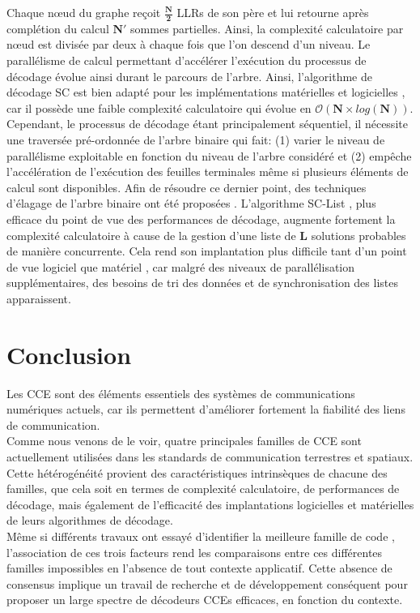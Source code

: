 \documentclass[../main.tex]{subfiles}
\begin{document}
Chaque nœud du graphe reçoit $\bm{\frac{N}{2}}$ LLRs de son père et lui retourne après complétion du calcul $\bm{N'}$ sommes partielles.
Ainsi, la complexité calculatoire par nœud est divisée par deux à chaque fois que l’on descend d’un niveau. Le parallélisme de calcul permettant d’accélérer l’exécution du processus de décodage évolue ainsi durant le parcours de l’arbre.
Ainsi, l’algorithme de décodage SC est bien adapté pour les implémentations matérielles \cite{88, 89, 90, 91, 92, 93} et logicielles \cite{PC:X1, PC:X2, PC:X3}, car il possède une faible complexité calculatoire qui évolue en $\mathcal{O}(\bm{N} \times log(\bm{N}))$.
Cependant, le processus de décodage étant principalement séquentiel, il nécessite une traversée pré-ordonnée de l’arbre binaire \cite{100} qui fait: (1) varier le niveau de parallélisme exploitable en fonction du niveau de l’arbre considéré et (2) empêche l’accélération de l’exécution des feuilles terminales même si plusieurs éléments de calcul sont disponibles.
Afin de résoudre ce dernier point, des techniques d’élagage de l’arbre binaire ont été proposées \cite{PC:prune}.
L’algorithme SC-List \cite{these_yann}, plus efficace du point de vue des performances de décodage, augmente fortement la complexité calculatoire à cause de la gestion d’une liste de \textbf{L} solutions probables de manière concurrente. Cela rend son implantation plus difficile tant d’un point de vue logiciel \cite{SCL:X1, SCL:X2} que matériel \cite{these_yann}, car malgré des niveaux de parallélisation supplémentaires, des besoins de tri des données et de synchronisation des listes apparaissent. 
% 
% 
% 
% 
% 
\section{Conclusion}
% 
% 
% 
% 
% 
Les CCE sont des éléments essentiels des systèmes de communications numériques actuels, car ils permettent d’améliorer fortement la fiabilité des liens de communication. \\
Comme nous venons de le voir, quatre principales familles de CCE sont actuellement utilisées dans les standards de communication terrestres et spatiaux. Cette hétérogénéité provient des caractéristiques intrinsèques de chacune des familles, que cela soit en termes de complexité calculatoire, de performances de décodage, mais également de l’efficacité des implantations logicielles et matérielles de leurs algorithmes de décodage.\\
Même si différents travaux ont essayé d’identifier la meilleure famille de code \cite{R1, R2, R3}, l’association de ces trois facteurs rend les comparaisons entre ces différentes familles impossibles en l’absence de tout contexte applicatif. Cette absence de consensus implique un travail de recherche et de développement conséquent pour proposer un large spectre de décodeurs CCEs efficaces, en fonction du contexte.
\end{document}
